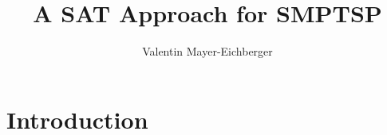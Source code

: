 \documentclass{article}
\title{A SAT Approach for SMPTSP}
\author{Valentin Mayer-Eichberger}
\begin{document}
 

\maketitle

\begin{abstract} 
\end{abstract}

\section{Introduction}
\end{document}
